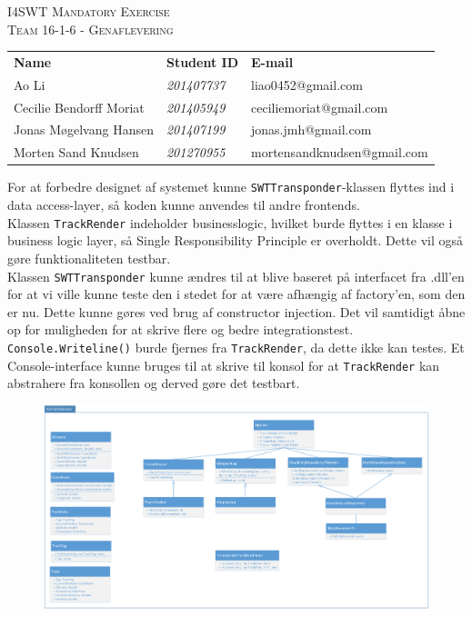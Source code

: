 


	
	\begin{center}
		\textsc{\large I4SWT Mandatory Exercise}\\[0.5cm]
		
		\textsc{\Large Team 16-1-6 - Genaflevering}\\
		\begin{center}
			\begin{tabular}{l l l}
				\textbf{Name} & \textbf{Student ID} & \textbf{E-mail} \\
				Ao Li & \textsl{201407737} &  liao0452@gmail.com  \\
				Cecilie Bendorff Moriat & \textsl{201405949} & ceciliemoriat@gmail.com \\
				Jonas Møgelvang Hansen & \textsl{201407199} & jonas.jmh@gmail.com \\
				Morten Sand Knudsen & \textsl{201270955} & mortensandknudsen@gmail.com \\
				
			\end{tabular}
		\end{center}
	\end{center}
	
	For at forbedre designet af systemet kunne \texttt{SWTTransponder}-klassen flyttes ind i data access-layer, så koden kunne anvendes til andre frontends. \\
	Klassen \texttt{TrackRender} indeholder businesslogic, hvilket burde flyttes i en klasse i business logic layer, så Single Responsibility Principle er overholdt. Dette vil også gøre funktionaliteten testbar.\\
	Klassen \texttt{SWTTransponder} kunne ændres til at blive baseret på interfacet fra .dll'en for at vi ville kunne teste den i stedet for at være afhængig af factory'en, som den er nu. Dette kunne gøres ved brug af constructor injection. Det vil samtidigt åbne op for muligheden for at skrive flere og bedre integrationstest.\\
	\texttt{Console.Writeline()} burde fjernes fra \texttt{TrackRender}, da dette ikke kan testes. Et Console-interface kunne bruges til at skrive til konsol for at \texttt{TrackRender} kan abstrahere fra konsollen og derved gøre det testbart.
	
	\begin{figure}[h!]
		\centering
		\includegraphics[width=1\linewidth]{classdiagram}
		\label{fig:classdiagram}
	\end{figure}

